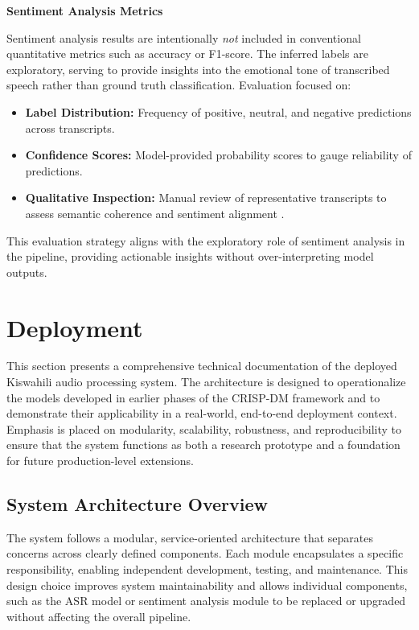 \textbf{Sentiment Analysis Metrics}

Sentiment analysis results are intentionally \textit{not} included in conventional quantitative metrics such as accuracy or F1-score. The inferred labels are exploratory, serving to provide insights into the emotional tone of transcribed speech rather than ground truth classification. Evaluation focused on:
\begin{itemize}
    \item \textbf{Label Distribution:} Frequency of positive, neutral, and negative predictions across transcripts.
    \item \textbf{Confidence Scores:} Model-provided probability scores to gauge reliability of predictions.
    \item \textbf{Qualitative Inspection:} Manual review of representative transcripts to assess semantic coherence and sentiment alignment \citep{Mabokela_Ngcobo_Masala_2025}.
\end{itemize}

This evaluation strategy aligns with the exploratory role of sentiment analysis in the pipeline, providing actionable insights without over-interpreting model outputs.

\section{Deployment}
\label{sec:technical_architecture}

This section presents a comprehensive technical documentation of the deployed Kiswahili audio processing system. The architecture is designed to operationalize the models developed in earlier phases of the CRISP-DM framework and to demonstrate their applicability in a real-world, end-to-end deployment context. Emphasis is placed on modularity, scalability, robustness, and reproducibility to ensure that the system functions as both a research prototype and a foundation for future production-level extensions.

\subsection{System Architecture Overview}

The system follows a modular, service-oriented architecture that separates concerns across clearly defined components. Each module encapsulates a specific responsibility, enabling independent development, testing, and maintenance. This design choice improves system maintainability and allows individual components, such as the ASR model or sentiment analysis module to be replaced or upgraded without affecting the overall pipeline.

